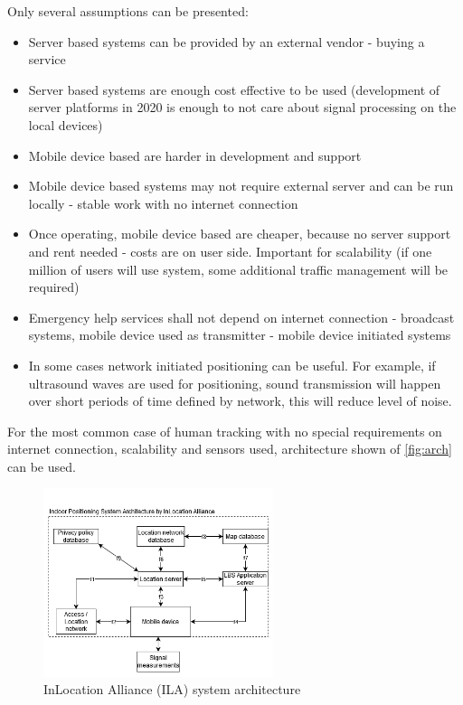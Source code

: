 Only several assumptions can be presented:

\begin{itemize}
	\item Server based systems can be provided by an external vendor - buying a service
	\item Server based systems are enough cost effective to be used (development of server platforms in 2020 is enough to not care about signal processing on the local devices)
	\item Mobile device based are harder in development and support
	\item Mobile device based systems may not require external server and can be run locally - stable work with no internet connection
	\item Once operating, mobile device based are cheaper, because no server support and rent needed - costs are on user side. Important for scalability (if one million of users will use system, some additional traffic management will be required)
	\item Emergency help services shall not depend on internet connection - broadcast systems, mobile device used as transmitter - mobile device initiated systems
	\item In some cases network initiated positioning can be useful. For example, if ultrasound waves are used for positioning, sound transmission will happen over short periods of time defined by network, this will reduce level of noise.
\end{itemize}

For the most common case of human tracking with no special requirements on internet connection, scalability and sensors used, architecture shown of \ref{fig:arch} can be used.

\begin{figure}[ht]
	\centering
	\includegraphics[width=0.6\textwidth]{graphics/roadmap/InLocation Alliance (ILA).png}
	\caption{InLocation Alliance (ILA) system architecture}
	\label{fig:arch2}
\end{figure}


